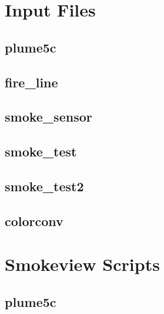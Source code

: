 \documentclass[11pt,twoside]{book}
\newcommand{\fdsinput}[1]{
{
\scriptsize

}
}
\begin{document}


\appendix
{}

\chapter{Input Files}
\label{fdsinputfiles}
\section{plume5c}
\label{FDSplume5c}
\fdsinput{plume5c.fds}

\section{fire\_line}
\label{FDSfireline}
\fdsinput{fire_line.fds}

\section{smoke\_sensor}
\label{FDSsmokesensor}
\fdsinput{smoke_sensor.fds}

\section{smoke\_test}
\label{FDSsmoketest}
\fdsinput{smoke_test.fds}

\section{smoke\_test2}
\label{FDSsmoketest2}
\fdsinput{smoke_test2.fds}

\section{colorconv}
\label{FDScolorconv}
\fdsinput{colorconv.fds}

\chapter{Smokeview Scripts}
\label{smvscripts}
\section{plume5c}
\label{SSFplume5c}
\fdsinput{plume5c.ssf}
\end{document}
